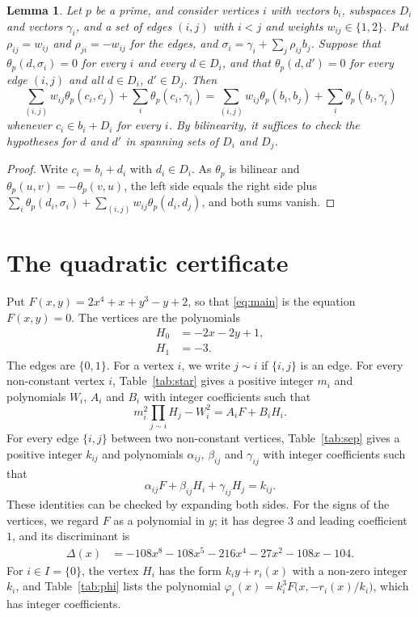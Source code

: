 \documentclass[11pt]{article}
\newtheorem{lemma}[theorem]{Lemma}
\begin{document}
\begin{lemma}\label{lem:cenvelope}
Let $p$ be a prime, and consider vertices $i$ with vectors $b_i$, subspaces $D_i$ and vectors $\gamma_i$, and a set of edges $(i,j)$ with $i<j$ and weights $w_{ij}\in\{1,2\}$. Put $\rho_{ij}=w_{ij}$ and $\rho_{ji}=-w_{ij}$ for the edges, and $\sigma_i=\gamma_i+\sum_j\rho_{ij}b_j$. Suppose that $\theta_p(d,\sigma_i)=0$ for every $i$ and every $d\in D_i$, and that $\theta_p(d,d')=0$ for every edge $(i,j)$ and all $d\in D_i$, $d'\in D_j$. Then
\[
\sum_{(i,j)}w_{ij}\theta_p(c_i,c_j)+\sum_i\theta_p(c_i,\gamma_i)=\sum_{(i,j)}w_{ij}\theta_p(b_i,b_j)+\sum_i\theta_p(b_i,\gamma_i)
\]
whenever $c_i\in b_i+D_i$ for every $i$. By bilinearity, it suffices to check the hypotheses for $d$ and $d'$ in spanning sets of $D_i$ and $D_j$.
\end{lemma}

\begin{proof}
Write $c_i=b_i+d_i$ with $d_i\in D_i$. As $\theta_p$ is bilinear and $\theta_p(u,v)=-\theta_p(v,u)$, the left side equals the right side plus $\sum_i\theta_p(d_i,\sigma_i)+\sum_{(i,j)}w_{ij}\theta_p(d_i,d_j)$, and both sums vanish.
\end{proof}

\section{The quadratic certificate}

Put $F(x,y)=2x^{4}+x+y^{3}-y+2$, so that \eqref{eq:main} is the equation $F(x,y)=0$. The vertices are the polynomials
\begin{align*}
H_{0}&=-2x-2y+1,\\
H_{1}&=-3.
\end{align*}
The edges are $\{0,1\}$. For a vertex $i$, we write $j\sim i$ if $\{i,j\}$ is an edge.
For every non-constant vertex $i$, Table~\ref{tab:star} gives a positive integer $m_{i}$ and polynomials $W_{i}$, $A_{i}$ and $B_{i}$ with integer coefficients such that
\begin{equation}\label{eq:star}
m_i^2\prod_{j\sim i}H_j-W_i^2=A_iF+B_iH_i.
\end{equation}
For every edge $\{i,j\}$ between two non-constant vertices, Table~\ref{tab:sep} gives a positive integer $k_{ij}$ and polynomials $\alpha_{ij}$, $\beta_{ij}$ and $\gamma_{ij}$ with integer coefficients such that
\begin{equation}\label{eq:sep}
\alpha_{ij}F+\beta_{ij}H_i+\gamma_{ij}H_j=k_{ij}.
\end{equation}
These identities can be checked by expanding both sides.
For the signs of the vertices, we regard $F$ as a polynomial in $y$; it has degree $3$ and leading coefficient $1$, and its discriminant is
\begin{align*}
\Delta(x)&=-108x^{8}-108x^{5}-216x^{4}-27x^{2}-108x-104.
\end{align*}
For $i\in I=\{0\}$, the vertex $H_i$ has the form $k_iy+r_i(x)$ with a non-zero integer $k_i$, and Table~\ref{tab:phi} lists the polynomial $\varphi_i(x)=k_i^3F\bigl(x,-r_i(x)/k_i\bigr)$, which has integer coefficients.
\end{document}
